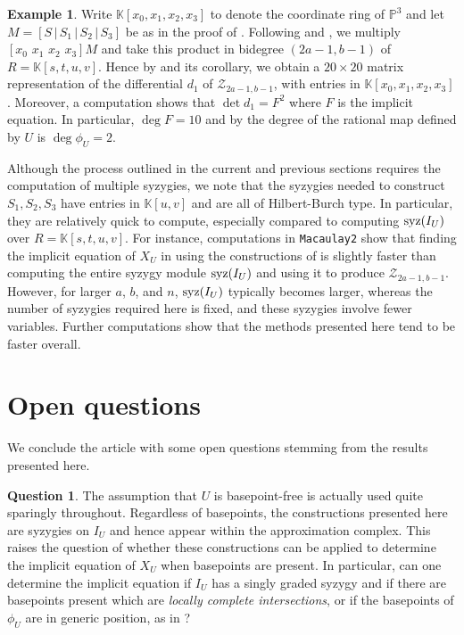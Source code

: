 \documentclass[reqno]{amsart}
\numberwithin{equation}{section}
\theoremstyle{definition}
\newtheorem{quest}[thm]{Question}
\newtheorem{ex}[thm]{Example}
\def\K{\mathbb{K}}
\def\P{\mathbb{P}}
\def\Z{\mathcal{Z}}
\def\syz{\mathop{\rm syz}}
\begin{document}
\begin{ex}
Write $\K[x_0,x_1,x_2,x_3]$ to denote the coordinate ring of $\P^3$ and let $M=[S\,|\,S_1\,|\,S_2\,|\,S_3]$ be as in the proof of .
Following  and , we multiply $[x_0\,\,x_1\,\,x_2\,\,x_3]M$ and take this product in bidegree $(2a-1,b-1)$ of $R= \K[s,t,u,v]$. Hence by  and its corollary, we obtain a $20\times 20$ matrix representation of the differential $d_1$ of $\Z_{2a-1,b-1}$, with entries in $\K[x_0,x_1,x_2,x_3]$. Moreover, a computation shows that $\det d_1 = F^2$ where $F$ is the implicit equation. In particular, $\deg F =10$ and by  the degree of the rational map defined by $U$ is $\deg \phi_U =2$.
\end{ex}

Although the process outlined in the current and previous sections requires the computation of multiple syzygies, we note that the syzygies needed to construct $S_1,S_2,S_3$ have entries in $\K[u,v]$ and are all of Hilbert-Burch type. In particular, they are relatively quick to compute, especially compared to computing $\syz(I_U)$ over $R=\K[s,t,u,v]$. For instance, computations in \texttt{Macaulay2} \cite{Macaulay2} show that finding the implicit equation of $X_U$ in  using the constructions of  is slightly faster than computing the entire syzygy module $\syz(I_U)$ and using it to produce $\Z_{2a-1,b-1}$. However, for larger $a$, $b$, and $n$, $\syz(I_U)$ typically becomes larger, whereas the number of syzygies required here is fixed, and these syzygies involve fewer variables. Further computations show that the methods presented here tend to be faster overall.






\section{Open questions}\label{Open questions section}


We conclude the article with some open questions stemming from the results presented here.

\begin{quest}
The assumption that $U$ is basepoint-free is actually used quite sparingly throughout. Regardless of basepoints, the constructions presented here are syzygies on $I_U$ and hence appear within the approximation complex. This raises the question of whether these constructions can be applied to determine the implicit equation of $X_U$ when basepoints are present. In particular, can one determine the implicit equation if $I_U$ has a singly graded syzygy and if there are basepoints present which are \textit{locally complete intersections}, or if the basepoints of $\phi_U$ are in generic position, as in \cite{Duarte17}?
\end{quest}
\end{document}
